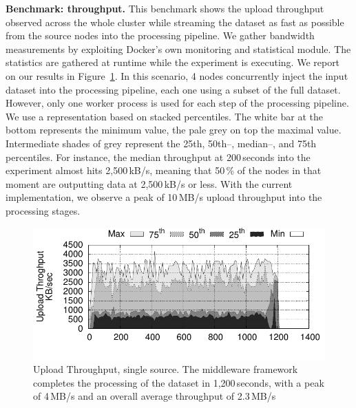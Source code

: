 \textbf{Benchmark: throughput.}
This benchmark shows the upload throughput observed across the whole cluster while streaming the dataset as fast as possible from the source nodes into the processing pipeline.
We gather bandwidth measurements by exploiting Docker's own monitoring and statistical module.
The statistics are gathered at runtime while the experiment is executing.
We report on our results in Figure~\ref{fig:throughput}.
In this scenario, 4 nodes concurrently inject the input dataset into the processing pipeline, each one using a subset of the full dataset.
However, only one worker process is used for each step of the processing pipeline.
We use a representation based on stacked percentiles.
The white bar at the bottom represents the minimum value, the pale grey on top the maximal value.
Intermediate shades of grey represent the 25th, 50th–, median–, and 75th percentiles.
For instance, the median throughput at 200\,seconds into the experiment almost hits 2,500\,kB/s, meaning that 50\,\% of the nodes in that moment are outputting data at 2,500\,kB/s or less.
With the current implementation, we observe a peak of 10\,MB/s upload throughput into the processing stages.%


\begin{figure}[t!]
  \centering
  \includegraphics[scale=0.7]{../../experiment/results/throughput/outputs/tput_upload_4-datas-1-worker.pdf}
  \caption{Upload Throughput, single source. The middleware framework completes the processing of the dataset in 1,200\,seconds, with a peak of 4\,MB/s and an overall average throughput of 2.3\,MB/s}
  \label{fig:throughput}
\end{figure}


